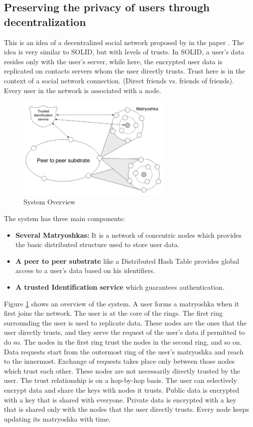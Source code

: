 \documentclass[11pt, conference, a4paper]{IEEEtran}
\begin{document}
\subsection{Preserving the privacy of users through decentralization}
This is an idea of a decentralized social network proposed by \citeauthor{4801860} in the paper  \cite{4801860}. The idea is very similar to SOLID, but with levels of trusts. In SOLID, a user's data resides only with the user's server, while here, the encrypted user data is replicated on contacts servers whom the user directly trusts. Trust here is in the context of a social network connection. (Direct friends vs. friends of friends). Every user in the network is associated with a node.\\
\begin{figure}[H]
\begin{center}
  \includegraphics[width=3in]{matryoshka.png}
\caption{System Overview \cite{4801860}}
\label{fig: matryoshka} 
\end{center}
\end{figure}
The system has three main components:
\begin{itemize}
\item \textbf{Several Matryoshkas:} It is a network of concentric nodes which provides the basic distributed structure used to store user data.
\item \textbf{A peer to peer substrate} like a Distributed Hash Table provides global access to a user's data based on his identifiers.
\item \textbf{A trusted Identification service} which guarantees authentication.
\end{itemize}
Figure \ref{fig: matryoshka} shows an overview of the system.
A user forms a matryoshka when it first joins the network. The user is at the core of the rings. The first ring surrounding the user is used to replicate data. These nodes are the ones that the user directly trusts, and they serve the request of the user's data if permitted to do so. The nodes in the first ring trust the nodes in the second ring, and so on. Data requests start from the outermost ring of the user's matryoshka and reach to the innermost. Exchange of requests takes place only between those nodes which trust each other. These nodes are not necessarily directly trusted by the user. The trust relationship is on a hop-by-hop basis. The user can selectively encrypt data and share the keys with nodes it trusts. Public data is encrypted with a key that is shared with everyone. Private data is encrypted with a key that is shared only with the nodes that the user directly trusts. Every node keeps updating its matryoshka with time.\\
\end{document}
